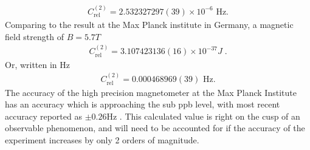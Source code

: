         \begin{align}
            C_{\text{rel}}^{(2)} =2.532327297(39)\times 10^{-6} \text{  Hz.}
        \end{align}
        \noindent Comparing to the result at the Max Planck institute in Germany, a magnetic field strength of $B = 5.7T$
        \begin{align}
            C_{\text{rel}}^{(2)} = 3.107423136(16)\times10^{-37} J\;.
        \end{align}
        \noindent Or, written in Hz
        \begin{align}
            C_{\text{rel}}^{(2)} = 0.000468969(39) \text{  Hz.}
        \end{align}
        \noindent The accuracy of the high precision magnetometer at the Max Planck Institute has an accuracy which is approaching the sub ppb level, with most recent accuracy reported as $\pm 0.26$Hz \cite{Schneider_Sikora_Dickopf_Müller_Oreshkina_Rischka_Valuev_Ulmer_Walz_Harman_et_al._2022}. This calculated value is right on the cusp of an observable phenomenon, and will need to be accounted for if the accuracy of the experiment increases by only 2 orders of magnitude.